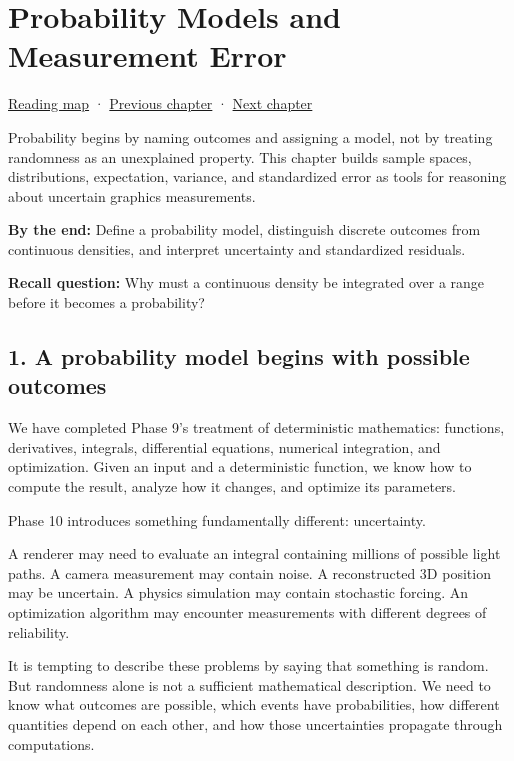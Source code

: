 \hypertarget{02-foundations-ii-ch023}{}
\chapter{Probability Models and Measurement Error}\label{stagechapter:02-foundations-ii-ch023}\label{02-foundations-ii-ch023-probability-models-and-measurement-error}

\hyperref[volume-reading-map]{Reading map} · \hyperref[02-foundations-ii-ch022-accumulation-quadrature-and-the-bridge-to-probability]{Previous chapter} · \hyperref[02-foundations-ii-ch024-waiting-times-covariance-and-matrix-decomposition]{Next chapter}

Probability begins by naming outcomes and assigning a model, not by treating randomness as an unexplained property. This chapter builds sample spaces, distributions, expectation, variance, and standardized error as tools for reasoning about uncertain graphics measurements.

\textbf{By the end:} Define a probability model, distinguish discrete outcomes from continuous densities, and interpret uncertainty and standardized residuals.

\textbf{Recall question:} Why must a continuous density be integrated over a range before it becomes a probability?

\section{1. A probability model begins with possible outcomes}\label{02-foundations-ii-ch023-a-probability-model-begins-with-possible-outcomes}

We have completed Phase 9's treatment of deterministic mathematics: functions, derivatives, integrals, differential equations, numerical integration, and optimization. Given an input and a deterministic function, we know how to compute the result, analyze how it changes, and optimize its parameters.

Phase 10 introduces something fundamentally different: uncertainty.

A renderer may need to evaluate an integral containing millions of possible light paths. A camera measurement may contain noise. A reconstructed 3D position may be uncertain. A physics simulation may contain stochastic forcing. An optimization algorithm may encounter measurements with different degrees of reliability.

It is tempting to describe these problems by saying that something is random. But randomness alone is not a sufficient mathematical description. We need to know what outcomes are possible, which events have probabilities, how different quantities depend on each other, and how those uncertainties propagate through computations.

